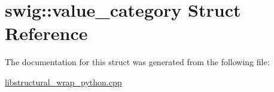 \hypertarget{structswig_1_1value__category}{}\section{swig\+:\+:value\+\_\+category Struct Reference}
\label{structswig_1_1value__category}


The documentation for this struct was generated from the following file\+:\begin{DoxyCompactItemize}
\item 
\hyperlink{libstructural__wrap__python_8cpp}{libstructural\+\_\+wrap\+\_\+python.\+cpp}\end{DoxyCompactItemize}
